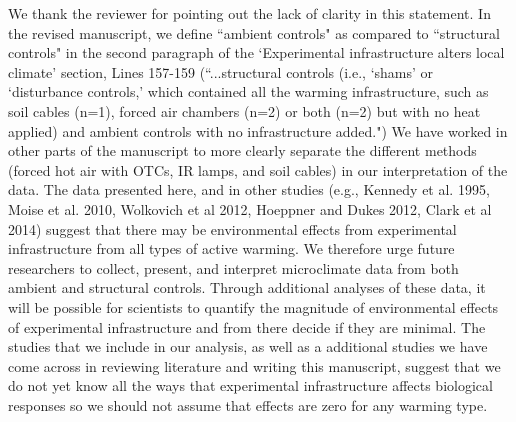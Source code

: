 \documentclass[11pt,a4paper]{letter}
\begin{document}
\begin{letter}{}
\par We thank the reviewer for pointing out the lack of clarity in this statement. In the revised manuscript, we define ``ambient controls" as compared to ``structural controls" in the second paragraph of the `Experimental infrastructure alters local climate' section, Lines 157-159 (``...structural controls (i.e., `shams' or `disturbance controls,' which contained all the warming infrastructure, such as soil cables (n=1), forced air chambers (n=2) or both (n=2) but with no heat applied) and ambient controls with no infrastructure added.") We have worked in other parts of the manuscript to more clearly separate the different methods (forced hot air with OTCs, IR lamps, and soil cables) in our interpretation of the data. The data presented here, and in other studies (e.g., Kennedy et al. 1995, Moise et al.  2010, Wolkovich et al 2012, Hoeppner and Dukes 2012, Clark et al 2014) suggest that there may be environmental effects from experimental infrastructure from all types of active warming. We therefore urge future researchers to collect, present, and interpret microclimate data from both ambient and structural controls. Through additional analyses of these data, it will be possible for scientists to quantify the magnitude of environmental effects of experimental infrastructure and from there decide if they are minimal. The studies that we include in our analysis, as well as a additional studies we have come across in reviewing literature and writing this manuscript, suggest that we do not yet know all the ways that experimental infrastructure affects biological responses so we should not assume that effects are zero for any warming type. \\

\end{letter}
\end{document}
